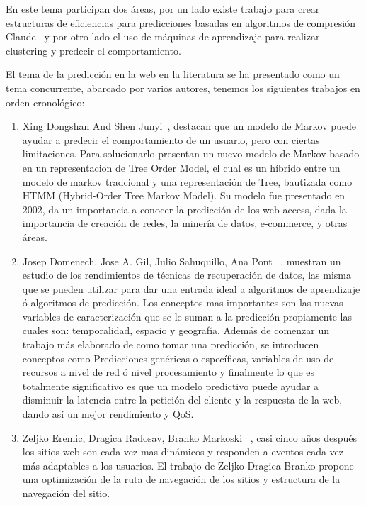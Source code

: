 \documentclass{udparticle}
\begin{document}
En este tema participan dos áreas, por un lado existe trabajo para crear estructuras de eficiencias para predicciones basadas en algoritmos de compresión Claude~\cite{BWT} y por otro lado el uso de máquinas de aprendizaje para realizar clustering y predecir el comportamiento.

El tema de la predicción en la web en la literatura se ha presentado como un tema concurrente, abarcado por varios autores, tenemos los siguientes trabajos en orden cronológico:


\begin{enumerate}

  \item Xing Dongshan And Shen Junyi~\cite{tmmd}, destacan que un modelo de Markov puede ayudar a predecir el comportamiento de un usuario, pero con ciertas limitaciones.
  Para solucionarlo presentan un nuevo modelo de Markov basado en un representacion de Tree Order Model, el cual es un híbrido entre un modelo de markov tradcional y una representación de Tree, bautizada como HTMM (Hybrid-Order Tree Markov Model). 
  Su modelo fue presentado en 2002, da un importancia a conocer la predicción de los web access, dada la importancia de creación de redes, la minería de datos, e-commerce, y otras áreas.  


  \item Josep Domenech, Jose A. Gil, Julio Sahuquillo, Ana Pont ~\cite{domenech}, muestran un estudio de los rendimientos de técnicas de recuperación de datos, las misma que se pueden utilizar para dar una entrada ideal a algoritmos de aprendizaje ó algoritmos de predicción. Los conceptos mas importantes son las nuevas variables de caracterización que se le suman a la predicción propiamente las cuales son: temporalidad, espacio y  geografía. 
  Además de comenzar un trabajo más elaborado de como tomar una predicción, se introducen conceptos como Predicciones genéricas o específicas, variables de uso de recursos a nivel de red ó nivel procesamiento y finalmente lo que es totalmente significativo es que un modelo predictivo puede ayudar a disminuir la latencia entre la petición del cliente y la respuesta de la web, dando así un mejor rendimiento y QoS.


  \item Zeljko Eremic, Dragica Radosav, Branko Markoski ~\cite{Dragica}, casi cinco años después los sitios web son cada vez mas dinámicos y responden a eventos cada vez más adaptables a los usuarios. El trabajo de Zeljko-Dragica-Branko propone una optimización de la ruta de navegación de los sitios y estructura de la navegación del sitio. 



\end{enumerate}
\end{document}
